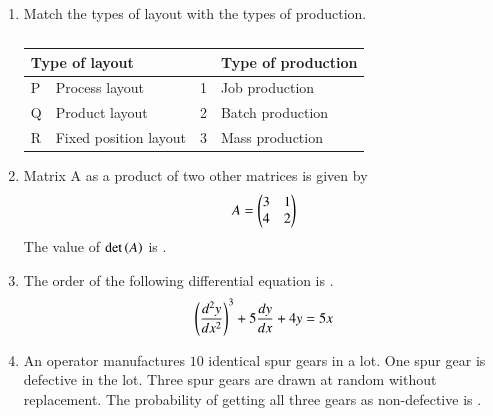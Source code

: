 \documentclass[journal,12pt,onecolumn]{IEEEtran}
\theoremstyle{remark}
\begin{document}
\begin{enumerate}
    \item Match the types of layout with the types of production.
    \begin{table}[h]
        \centering
        \caption*{}
        \label{tab:q22}
        \begin{tabular}{llcl}
            \hline
            \multicolumn{2}{l}{Type of layout} & & Type of production \\
            \hline
            P & Process layout & 1 & Job production \\
            Q & Product layout & 2 & Batch production \\
            R & Fixed position layout & 3 & Mass production \\
            \hline
        \end{tabular}
    \end{table}

    \hfill{}
    \begin{enumerate}
    \end{enumerate}

    \item Matrix A as a product of two other matrices is given by
    \begin{align*}
        A = \begin{pmatrix}3 & 1 \\ 4 & 2\end{pmatrix}
    \end{align*}
    The value of $\det\left(A\right)$ is \underline{\hspace{2cm}}.

    \hfill{}

    \item The order of the following differential equation is \underline{\hspace{2cm}}.
    \begin{align*}
        \left(\frac{d^2y}{dx^2}\right)^3 + 5\frac{dy}{dx} + 4y = 5x
    \end{align*}

    \hfill{}

    \item An operator manufactures $10$ identical spur gears in a lot. One spur gear is defective in the lot. Three spur gears are drawn at random without replacement. The probability of getting all three gears as non-defective is \underline{\hspace{2cm}}.


\end{enumerate}
\end{document}
